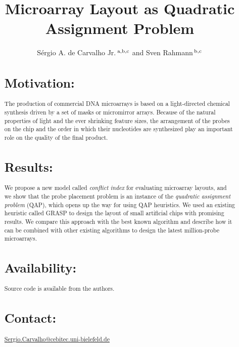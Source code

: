 \documentclass{bioinfo}
\begin{document}

\title{Microarray Layout as Quadratic Assignment Problem}
\author[de Carvalho Jr. and Rahmann]{S\'ergio A. de Carvalho Jr.\,$^{\rm a,b,c}$ and Sven Rahmann\,$^{\rm b,c}$}
\address{$^{\rm a}$Graduiertenkolleg Bioinformatik, Bielefeld University, Germany,\\
  $^{\rm b}$International NRW Graduate School in Bioinformatics and Genome Research, Bielefeld University, Germany,\\
  $^{\rm c}$Algorithms and Statistics for Systems Biology group, Genome Informatics, Technische Fakult\"at, Bielefeld University, D-33594 Bielefeld, Germany.
}
\maketitle

\begin{abstract}
\section{Motivation:}
The production of commercial DNA microarrays is based on a
light-directed chemical synthesis driven by a set of masks or
micromirror arrays. Because of the natural properties of light and the
ever shrinking feature sizes, the arrangement of the probes on the
chip and the order in which their nucleotides are synthesized play an
important role on the quality of the final product.
\section{Results:}
We propose a new model called \emph{conflict index} for evaluating
microarray layouts, and we show that the probe placement problem is an
instance of the \emph{quadratic assignment problem} (QAP), which opens
up the way for using QAP heuristics. We used an existing heuristic
called GRASP to design the layout of small artificial chips with
promising results. We compare this approach with the best known
algorithm and describe how it can be combined with other existing
algorithms to design the latest million-probe microarrays.
\section{Availability:}
Source code is available from the authors.
\section{Contact:} \href{Sergio.Carvalho@cebitec.uni-bielefeld.de}{Sergio.Carvalho@cebitec.uni-bielefeld.de}
\end{abstract}
\end{document}
